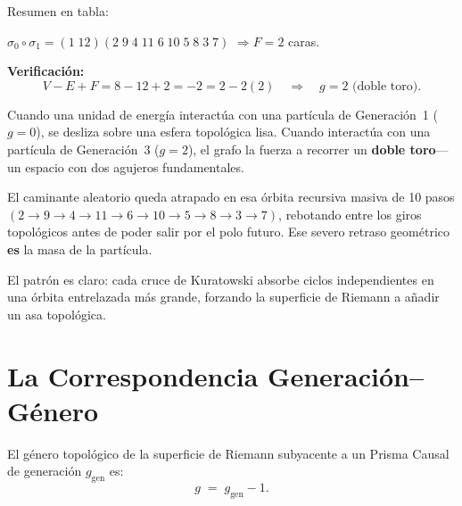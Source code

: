 \documentclass[11pt, a4paper, openany]{book}
\begin{document}
\medskip
\noindent
Resumen en tabla:
\begin{center}
\renewcommand{\arraystretch}{1.15}
\end{center}
$\sigma_0 \circ \sigma_1 = (1\;12)(2\;9\;4\;11\;6\;10\;5\;8\;3\;7)$
\quad$\Longrightarrow$\quad $F = 2$ caras.

\medskip
\noindent
\textbf{Verificación:}
\[
  V - E + F = 8 - 12 + 2 = -2 = 2 - 2(2)
  \quad\Longrightarrow\quad \boxed{g = 2} \text{ (doble toro).}
\]

\begin{result}[title={La física del quark Top}]
Cuando una unidad de energía interactúa con una partícula de
Generación~1 ($g = 0$), se desliza sobre una esfera topológica lisa.
Cuando interactúa con una partícula de Generación~3 ($g = 2$), el grafo
la fuerza a recorrer un \textbf{doble toro}---un espacio con dos
agujeros fundamentales.

El caminante aleatorio queda atrapado en esa órbita recursiva masiva de
10 pasos $(2 \to 9 \to 4 \to 11 \to 6 \to 10 \to 5 \to 8 \to 3 \to 7)$,
rebotando entre los giros topológicos antes de poder salir por el polo
futuro. Ese severo retraso geométrico \textbf{es} la masa de la
partícula.
\end{result}

\noindent
El patrón es claro: cada cruce de Kuratowski absorbe ciclos
independientes en una órbita entrelazada más grande, forzando la
superficie de Riemann a añadir un asa topológica.

\section{La Correspondencia Generación--Género}
\label{sec:gen-genero}

\begin{theorem}
\label{thm:gen-genero}
El género topológico de la superficie de Riemann subyacente a un Prisma
Causal de generación $g_{\mathrm{gen}}$ es:
\[
  g \;=\; g_{\mathrm{gen}} - 1.
\]
\end{theorem}
\end{document}
